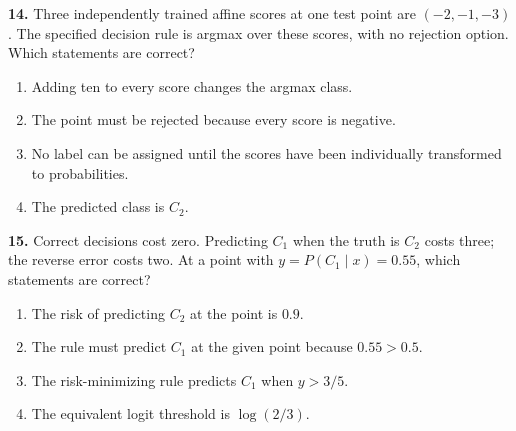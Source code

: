 \documentclass[11pt,a4paper]{article}
\begin{document}
\par\noindent\begin{minipage}{\linewidth}
\textbf{14.} Three independently trained affine scores at one test point are \((-2,-1,-3)\). The specified decision rule is argmax over these scores, with no rejection option. Which statements are correct?
\begin{enumerate}[label=(\Alph*),leftmargin=8mm,itemsep=2pt,topsep=2pt]
\item Adding ten to every score changes the argmax class.
\item The point must be rejected because every score is negative.
\item No label can be assigned until the scores have been individually transformed to probabilities.
\item The predicted class is \(C_2\).
\end{enumerate}

\end{minipage}\par\vspace{3mm}
\par\noindent\begin{minipage}{\linewidth}
\textbf{15.} Correct decisions cost zero. Predicting \(C_1\) when the truth is \(C_2\) costs three; the reverse error costs two. At a point with \(y=P(C_1\mid x)=0.55\), which statements are correct?
\begin{enumerate}[label=(\Alph*),leftmargin=8mm,itemsep=2pt,topsep=2pt]
\item The risk of predicting \(C_2\) at the point is \(0.9\).
\item The rule must predict \(C_1\) at the given point because \(0.55>0.5\).
\item The risk-minimizing rule predicts \(C_1\) when \(y>3/5\).
\item The equivalent logit threshold is \(\log(2/3)\).
\end{enumerate}

\end{minipage}\par\vspace{3mm}
\end{document}
